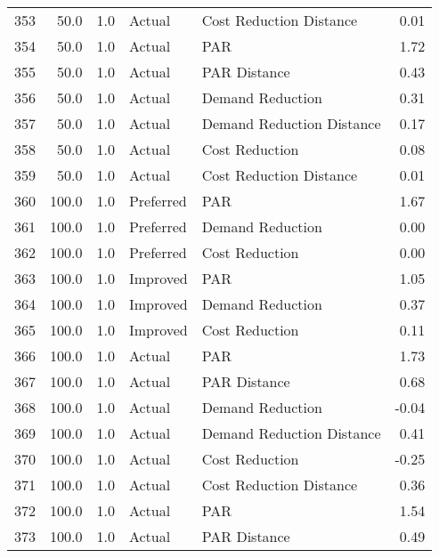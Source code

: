 \begin{longtable}{lrrllr}
353  &         50.0 &     1.0 &         Actual &    Cost Reduction Distance &   0.01 \\
354  &         50.0 &     1.0 &         Actual &                        PAR &   1.72 \\
355  &         50.0 &     1.0 &         Actual &               PAR Distance &   0.43 \\
356  &         50.0 &     1.0 &         Actual &           Demand Reduction &   0.31 \\
357  &         50.0 &     1.0 &         Actual &  Demand Reduction Distance &   0.17 \\
358  &         50.0 &     1.0 &         Actual &             Cost Reduction &   0.08 \\
359  &         50.0 &     1.0 &         Actual &    Cost Reduction Distance &   0.01 \\
360  &        100.0 &     1.0 &      Preferred &                        PAR &   1.67 \\
361  &        100.0 &     1.0 &      Preferred &           Demand Reduction &   0.00 \\
362  &        100.0 &     1.0 &      Preferred &             Cost Reduction &   0.00 \\
363  &        100.0 &     1.0 &       Improved &                        PAR &   1.05 \\
364  &        100.0 &     1.0 &       Improved &           Demand Reduction &   0.37 \\
365  &        100.0 &     1.0 &       Improved &             Cost Reduction &   0.11 \\
366  &        100.0 &     1.0 &         Actual &                        PAR &   1.73 \\
367  &        100.0 &     1.0 &         Actual &               PAR Distance &   0.68 \\
368  &        100.0 &     1.0 &         Actual &           Demand Reduction &  -0.04 \\
369  &        100.0 &     1.0 &         Actual &  Demand Reduction Distance &   0.41 \\
370  &        100.0 &     1.0 &         Actual &             Cost Reduction &  -0.25 \\
371  &        100.0 &     1.0 &         Actual &    Cost Reduction Distance &   0.36 \\
372  &        100.0 &     1.0 &         Actual &                        PAR &   1.54 \\
373  &        100.0 &     1.0 &         Actual &               PAR Distance &   0.49 \\

\end{longtable}
